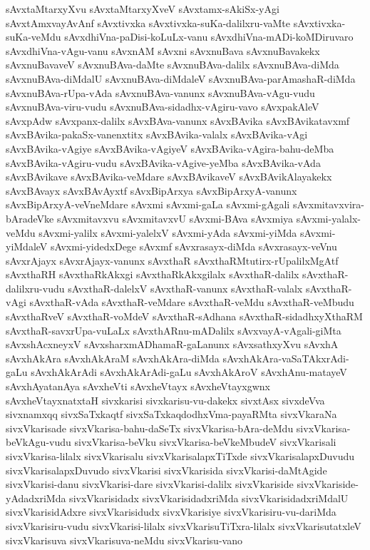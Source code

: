 {sAvxtaMtarxyXvu
sAvxtaMtarxyXveV
sAvxtamx-sAkiSx-yAgi
sAvxtAmxvayAvAnf
sAvxtivxka
sAvxtivxka-suKa-dalilxru-vaMte
sAvxtivxka-suKa-veMdu
sAvxdhiVna-paDisi-koLuLx-vanu
sAvxdhiVna-mADi-koMDiruvaro
sAvxdhiVna-vAgu-vanu
sAvxnAM
sAvxni
sAvxnuBava
sAvxnuBavakekx
sAvxnuBavaveV
sAvxnuBAva-daMte
sAvxnuBAva-dalilx
sAvxnuBAva-diMda
sAvxnuBAva-diMdalU
sAvxnuBAva-diMdaleV
sAvxnuBAva-parAmashaR-diMda
sAvxnuBAva-rUpa-vAda
sAvxnuBAva-vanunx
sAvxnuBAva-vAgu-vudu
sAvxnuBAva-viru-vudu
sAvxnuBAva-sidadhx-vAgiru-vavo
sAvxpakAleV
sAvxpAdw
sAvxpanx-dalilx
sAvxBAva-vanunx
sAvxBAvika
sAvxBAvikatavxmf
sAvxBAvika-pakaSx-vanenxtitx
sAvxBAvika-valalx
sAvxBAvika-vAgi
sAvxBAvika-vAgiye
sAvxBAvika-vAgiyeV
sAvxBAvika-vAgira-bahu-deMba
sAvxBAvika-vAgiru-vudu
sAvxBAvika-vAgive-yeMba
sAvxBAvika-vAda
sAvxBAvikave
sAvxBAvika-veMdare
sAvxBAvikaveV
sAvxBAvikAlayakekx
sAvxBAvayx
sAvxBAvAyxtf
sAvxBipArxya
sAvxBipArxyA-vanunx
sAvxBipArxyA-veVneMdare
sAvxmi
sAvxmi-gaLa
sAvxmi-gAgali
sAvxmitavxvira-bAradeVke
sAvxmitavxvu
sAvxmitavxvU
sAvxmi-BAva
sAvxmiya
sAvxmi-yalalx-veMdu
sAvxmi-yalilx
sAvxmi-yalelxV
sAvxmi-yAda
sAvxmi-yiMda
sAvxmi-yiMdaleV
sAvxmi-yidedxDege
sAvxmf
sAvxrasayx-diMda
sAvxrasayx-veVnu
sAvxrAjayx
sAvxrAjayx-vanunx
sAvxthaR
sAvxthaRMtutirx-rUpalilxMgAtf
sAvxthaRH
sAvxthaRkAkxgi
sAvxthaRkAkxgilalx
sAvxthaR-dalilx
sAvxthaR-dalilxru-vudu
sAvxthaR-dalelxV
sAvxthaR-vanunx
sAvxthaR-valalx
sAvxthaR-vAgi
sAvxthaR-vAda
sAvxthaR-veMdare
sAvxthaR-veMdu
sAvxthaR-veMbudu
sAvxthaRveV
sAvxthaR-voMdeV
sAvxthaR-sAdhana
sAvxthaR-sidadhxyXthaRM
sAvxthaR-savxrUpa-vuLaLx
sAvxthARnu-mADalilx
sAvxvayA-vAgali-giMta
sAvxshAcxneyxV
sAvxsharxmADhamaR-gaLanunx
sAvxsathxyXvu
sAvxhA
sAvxhAkAra
sAvxhAkAraM
sAvxhAkAra-diMda
sAvxhAkAra-vaSaTAkxrAdi-gaLu
sAvxhAkArAdi
sAvxhAkArAdi-gaLu
sAvxhAkAroV
sAvxhAnu-matayeV
sAvxhAyatanAya
sAvxheVti
sAvxheVtayx
sAvxheVtayxgwnx
sAvxheVtayxnatxtaH
sivxkarisi
sivxkarisu-vu-dakekx
sivxtAsx
sivxdeVva
sivxnamxqq
sivxSaTxkaqtf
sivxSaTxkaqdodhxVma-payaRMta
sivxVkaraNa
sivxVkarisade
sivxVkarisa-bahu-daSeTx
sivxVkarisa-bAra-deMdu
sivxVkarisa-beVkAgu-vudu
sivxVkarisa-beVku
sivxVkarisa-beVkeMbudeV
sivxVkarisali
sivxVkarisa-lilalx
sivxVkarisalu
sivxVkarisalapxTiTxde
sivxVkarisalapxDuvudu
sivxVkarisalapxDuvudo
sivxVkarisi
sivxVkarisida
sivxVkarisi-daMtAgide
sivxVkarisi-danu
sivxVkarisi-dare
sivxVkarisi-dalilx
sivxVkariside
sivxVkariside-yAdadxriMda
sivxVkarisidadx
sivxVkarisidadxriMda
sivxVkarisidadxriMdalU
sivxVkarisidAdxre
sivxVkarisidudx
sivxVkarisiye
sivxVkarisiru-vu-dariMda
sivxVkarisiru-vudu
sivxVkarisi-lilalx
sivxVkarisuTiTxra-lilalx
sivxVkarisutatxleV
sivxVkarisuva
sivxVkarisuva-neMdu
sivxVkarisu-vano
}
